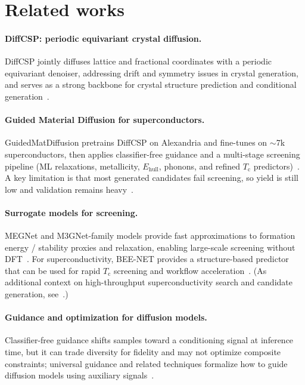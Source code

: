 \documentclass{article}
\newcommand{\Tc}{T_{\mathrm{c}}}
\newcommand{\Ehull}{E_{\mathrm{hull}}}
\begin{document}
\section{Related works}

\paragraph{DiffCSP: periodic equivariant crystal diffusion.}
DiffCSP jointly diffuses lattice and fractional coordinates with a periodic equivariant denoiser, addressing drift and symmetry issues in crystal generation, and serves as a strong backbone for crystal structure prediction and conditional generation~\citep{jiao2023diffcsp}.

\paragraph{Guided Material Diffusion for superconductors.}
GuidedMatDiffusion pretrains DiffCSP on Alexandria and fine-tunes on $\sim$7k superconductors, then applies classifier-free guidance and a multi-stage screening pipeline (ML relaxations, metallicity, $\Ehull$, phonons, and refined $\Tc$ predictors)~\citep{prakash2025guidedmatdiffusion}.
A key limitation is that most generated candidates fail screening, so yield is still low and validation remains heavy~\citep{prakash2025guidedmatdiffusion}.

\paragraph{Surrogate models for screening.}
MEGNet and M3GNet-family models provide fast approximations to formation energy / stability proxies and relaxation, enabling large-scale screening without DFT~\citep{chen2019megnet,chen2022m3gnet}.
For superconductivity, BEE-NET provides a structure-based predictor that can be used for rapid $\Tc$ screening and workflow acceleration~\citep{gibson2025workflow,gibson2026beenet}.
(As additional context on high-throughput superconductivity search and candidate generation, see~\citep{cerqueira2023sampling}.)

\paragraph{Guidance and optimization for diffusion models.}
Classifier-free guidance shifts samples toward a conditioning signal at inference time, but it can trade diversity for fidelity and may not optimize composite constraints; universal guidance and related techniques formalize how to guide diffusion models using auxiliary signals~\citep{bansal2023universalguidance}.
\end{document}
